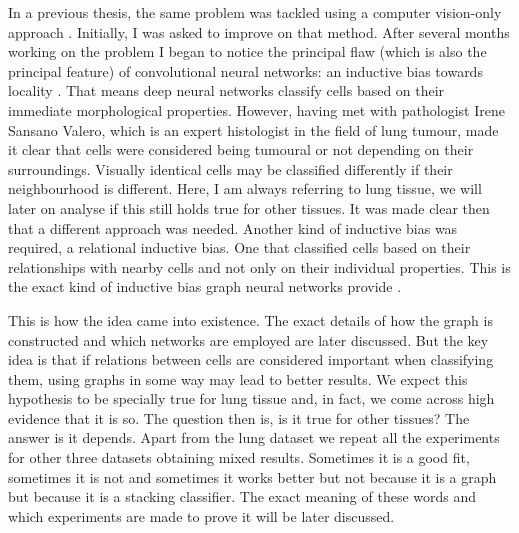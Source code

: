 In a previous thesis, the same problem was tackled using a computer vision-only approach \cite{upcommons353765}. Initially, I was asked to improve on that method. After several months working on the problem I began to notice the principal flaw (which is also the principal feature) of convolutional neural networks: an inductive bias towards locality \cite{DBLP:journals/corr/CohenS16a}. That means deep neural networks classify cells based on their immediate morphological properties. However, having met with pathologist Irene Sansano Valero, which is an expert histologist in the field of lung tumour, made it clear that cells were considered being tumoural or not depending on their surroundings. Visually identical cells may be classified differently if their neighbourhood is different. Here, I am always referring to lung tissue, we will later on analyse if this still holds true for other tissues. It was made clear then that a different approach was needed. Another kind of inductive bias was required, a relational inductive bias. One that classified cells based on their relationships with nearby cells and not only on their individual properties. This is the exact kind of inductive bias graph neural networks provide \cite{DBLP:journals/corr/abs-2104-13478}. 

This is how the idea came into existence. The exact details of how the graph is constructed and which networks are employed are later discussed. But the key idea is that if relations between cells are considered important when classifying them, using graphs in some way may lead to better results. We expect this hypothesis to be specially true for lung tissue and, in fact, we come across high evidence that it is so. The question then is, is it true for other tissues? The answer is it depends. Apart from the lung dataset we repeat all the experiments for other three datasets obtaining mixed results. Sometimes it is a good fit, sometimes it is not and sometimes it works better but not because it is a graph but because it is a stacking classifier. The exact meaning of these words and which experiments are made to prove it will be later discussed.
